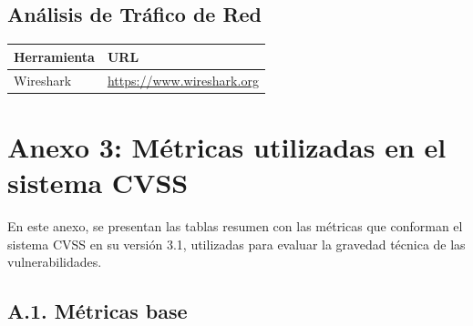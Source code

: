 \documentclass[a4paper, 11pt]{article}
\begin{document}
\subsection*{Análisis de Tráfico de Red}
\begin{table}[H]
\centering
\begin{tabular}{|m{5cm}|m{10cm}|}
\hline
\textbf{Herramienta} & \textbf{URL} \\
\hline
Wireshark & \url{https://www.wireshark.org} \\
\hline
\end{tabular}
\end{table}








\clearpage
\thispagestyle{nohead}

\section*{Anexo 3: Métricas utilizadas en el sistema CVSS}
\label{anexo:3}


En este anexo, se presentan las tablas resumen con las métricas que conforman el sistema CVSS en su versión 3.1, utilizadas para evaluar la gravedad técnica de las vulnerabilidades.

\vspace{0.5cm}

\subsection*{A.1. Métricas base}
\end{document}

